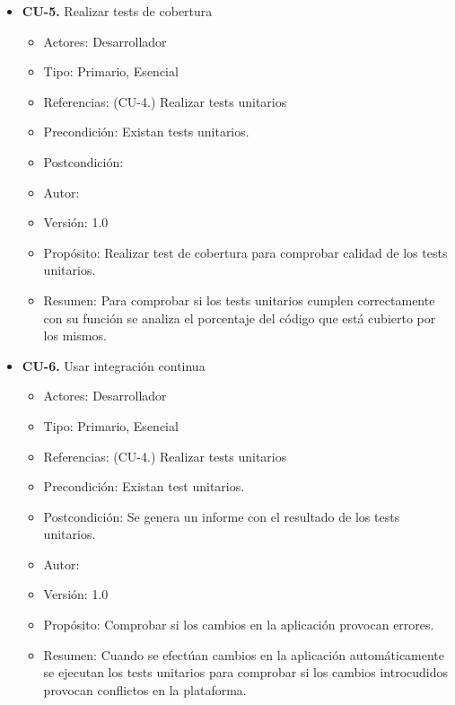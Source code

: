 \begin{itemize}
  \item \textbf{CU-5.} Realizar tests de cobertura
  \begin{itemize}
    \item Actores: Desarrollador
    \item Tipo: Primario, Esencial
    \item Referencias: (CU-4.) Realizar tests unitarios
    \item Precondición: Existan tests unitarios.
    \item Postcondición: 
    \item Autor: \autor
    \item Versión: 1.0
    \item Propósito: Realizar test de cobertura para comprobar calidad de los tests unitarios.
    \item Resumen: Para comprobar si los tests unitarios cumplen correctamente con su función se analiza el porcentaje del
    código que está cubierto por los mismos.
  \end{itemize}
 
  \newpage
  \item \textbf{CU-6.} Usar integración continua
  \begin{itemize}
    \item Actores: Desarrollador
    \item Tipo: Primario, Esencial
    \item Referencias: (CU-4.) Realizar tests unitarios
    \item Precondición: Existan test unitarios.
    \item Postcondición: Se genera un informe con el resultado de los tests unitarios.
    \item Autor: \autor
    \item Versión: 1.0
    \item Propósito: Comprobar si los cambios en la aplicación provocan errores.
    \item Resumen: Cuando se efectúan cambios en la aplicación automáticamente se ejecutan los tests unitarios para comprobar si
    los cambios introcudidos provocan conflictos en la plataforma.
  \end{itemize}
 

\end{itemize}
